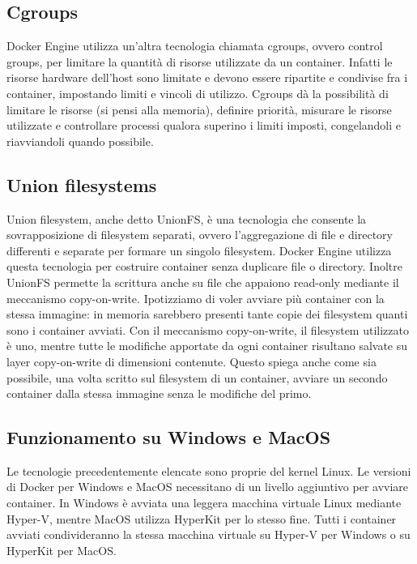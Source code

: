 \subsection{Cgroups}
Docker Engine utilizza un'altra tecnologia chiamata cgroups, ovvero control groups, per limitare la quantità di risorse utilizzate da un container. Infatti le risorse hardware dell'host sono limitate e devono essere ripartite e condivise fra i container, impostando limiti e vincoli di utilizzo. Cgroups dà la possibilità di limitare le risorse (si pensi alla memoria), definire priorità, misurare le risorse utilizzate e controllare processi qualora superino i limiti imposti, congelandoli e riavviandoli quando possibile.

\subsection{Union filesystems}
Union filesystem, anche detto UnionFS, è una tecnologia che consente la sovrapposizione di filesystem separati, ovvero l'aggregazione di file e directory differenti e separate per formare un singolo filesystem. Docker Engine utilizza questa tecnologia per costruire container senza duplicare file o directory. Inoltre UnionFS permette la scrittura anche su file che appaiono read-only mediante il meccanismo copy-on-write. Ipotizziamo di voler avviare più container con la stessa immagine: in memoria sarebbero presenti tante copie dei filesystem quanti sono i container avviati. Con il meccanismo copy-on-write, il filesystem utilizzato è uno, mentre tutte le modifiche apportate da ogni container risultano salvate su layer copy-on-write di dimensioni contenute. Questo spiega anche come sia possibile, una volta scritto sul filesystem di un container, avviare un secondo container dalla stessa immagine senza le modifiche del primo.

\subsection{Funzionamento su Windows e MacOS}
Le tecnologie precedentemente elencate sono proprie del kernel Linux. Le versioni di Docker per Windows e MacOS necessitano di un livello aggiuntivo per avviare container. In Windows è avviata una leggera macchina virtuale Linux mediante Hyper-V, mentre MacOS utilizza HyperKit per lo stesso fine. Tutti i container avviati condivideranno la stessa macchina virtuale su Hyper-V per Windows o su HyperKit per MacOS.


